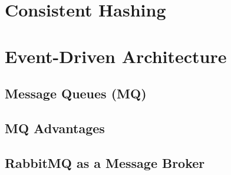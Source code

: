 
\section{Consistent Hashing}

\pagebreak

\section{Event-Driven Architecture}
\subsection{Message Queues (MQ)}
\subsection{MQ Advantages}
\subsection{RabbitMQ as a Message Broker}